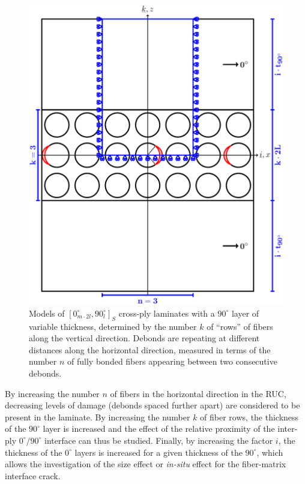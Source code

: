 \documentclass[review]{elsarticle}
\begin{document}
\begin{figure}[!h]
\centering
        \includegraphics[width=\textwidth]{ThickPly.pdf}
\caption{Models of $\left[0_{m\cdot2l}^{\circ},90_{l}^{\circ}\right]_{S}$ cross-ply laminates with a $90^{\circ}$ layer of variable thickness, determined by the number $k$ of ``rows'' of fibers along the vertical direction.  Debonds are repeating at different distances along the horizontal direction, measured in terms of the number $n$ of fully bonded fibers appearing between two consecutive debonds.}\label{fig:laminateModelsB}
\end{figure}

By increasing the number $n$ of fibers in the horizontal direction in the RUC, decreasing levels of damage (debonds spaced further apart) are considered to be present in the laminate. By increasing the number $k$ of fiber rows, the thickness of the $90^{\circ}$ layer is increased and the effect of the relative proximity of the inter-ply $0^{\circ}/90^{\circ}$ interface can thus be studied. Finally, by increasing the factor $i$, the thickness of the $0^{\circ}$ layers is increased for a given thickness of the $90^{\circ}$, which allows the investigation of the size effect or \emph{in-situ} effect for the fiber-matrix interface crack.
\end{document}
